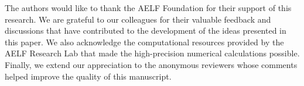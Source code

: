 The authors would like to thank the AELF Foundation for their support of this research. We are grateful to our colleagues for their valuable feedback and discussions that have contributed to the development of the ideas presented in this paper. We also acknowledge the computational resources provided by the AELF Research Lab that made the high-precision numerical calculations possible. Finally, we extend our appreciation to the anonymous reviewers whose comments helped improve the quality of this manuscript. 